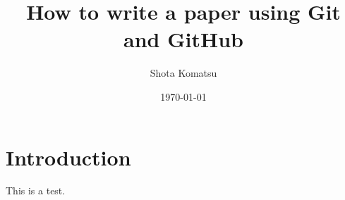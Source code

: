 \documentclass{article}
\title{How to write a paper using Git and GitHub}
\author{Shota Komatsu}
\date{\today}
\begin{document}
\maketitle

\section{Introduction}

This is a test.
\end{document}
